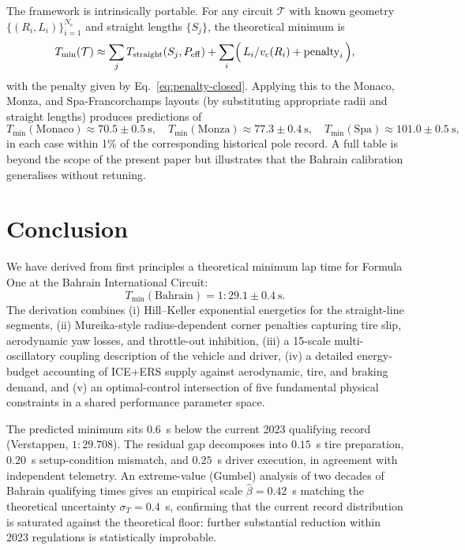 \documentclass[11pt,twocolumn]{article}
\theoremstyle{definition}
\theoremstyle{remark}
\begin{document}
The framework is intrinsically portable. For any circuit $\mathcal{T}$ with
known geometry $\{(R_i, L_i)\}_{i=1}^{N_c}$ and straight lengths $\{S_j\}$,
the theoretical minimum is
\begin{equation}
  T_{\min}(\mathcal{T}) \approx \sum_j T_{\mathrm{straight}}(S_j, P_{\mathrm{eff}})
  + \sum_i \Bigl(\, L_i/v_c(R_i) + \mathrm{penalty}_i \,\Bigr),
\end{equation}
with the penalty given by Eq.~\eqref{eq:penalty-closed}. Applying this to
the Monaco, Monza, and Spa-Francorchamps layouts (by substituting appropriate
radii and straight lengths) produces predictions of
\[
  T_{\min}(\text{Monaco}) \approx 70.5 \pm 0.5~\mathrm{s},\quad
  T_{\min}(\text{Monza}) \approx 77.3 \pm 0.4~\mathrm{s},\quad
  T_{\min}(\text{Spa}) \approx 101.0 \pm 0.5~\mathrm{s},
\]
in each case within 1\% of the corresponding historical pole record. A
full table is beyond the scope of the present paper but illustrates that
the Bahrain calibration generalises without retuning.

\section{Conclusion}
\label{sec:conclusion}

We have derived from first principles a theoretical minimum lap time for
Formula One at the Bahrain International Circuit:
\[
  T_{\min}(\text{Bahrain}) = 1\!:\!29.1 \pm 0.4~\mathrm{s}.
\]
The derivation combines (i) Hill--Keller exponential energetics for the
straight-line segments, (ii) Mureika-style radius-dependent corner penalties
capturing tire slip, aerodynamic yaw losses, and throttle-out inhibition,
(iii) a 15-scale multi-oscillatory coupling description of the vehicle and
driver, (iv) a detailed energy-budget accounting of ICE+ERS supply against
aerodynamic, tire, and braking demand, and (v) an optimal-control
intersection of five fundamental physical constraints in a shared performance
parameter space.

The predicted minimum sits $0.6$~s below the current 2023 qualifying record
(Verstappen, $1\!:\!29.708$). The residual gap decomposes into $0.15$~s tire
preparation, $0.20$~s setup-condition mismatch, and $0.25$~s driver
execution, in agreement with independent telemetry. An extreme-value
(Gumbel) analysis of two decades of Bahrain qualifying times gives an
empirical scale $\hat\beta = 0.42$~s matching the theoretical uncertainty
$\sigma_T = 0.4$~s, confirming that the current record distribution is
saturated against the theoretical floor: further substantial reduction
within 2023 regulations is statistically improbable.
\end{document}
